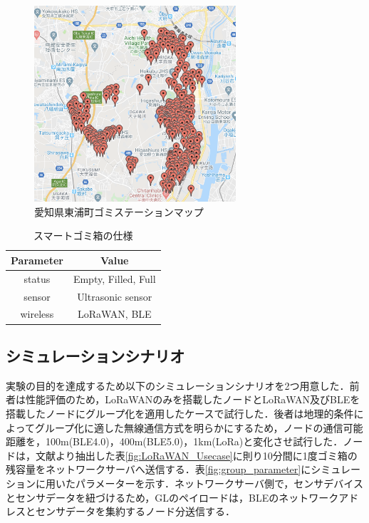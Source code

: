 \documentclass[Japanese]{dicomopapers}
\begin{document}
\begin{figure}[h]
    \centering
    \includegraphics[width=7.5cm]{img/garbage_station.png}
    \caption{愛知県東浦町ゴミステーションマップ}
    \label{garbage_station_map}
\end{figure}

\begin{table}[h]
    \centering
    \caption{スマートゴミ箱の仕様}\label{tab:smart_garbage_spec}
    \begin{tabular}{|c|c|}
    \hline
    \textbf{Parameter} & \textbf{Value} \\ \hline
    status   & Empty, Filled, Full   \\ \hline
    sensor   & Ultrasonic sensor     \\ \hline
    wireless & LoRaWAN, BLE          \\ \hline
    \end{tabular}
\end{table}

\subsection{シミュレーションシナリオ}
実験の目的を達成するため以下のシミュレーションシナリオを2つ用意した．前者は性能評価のため，LoRaWANのみを搭載したノードとLoRaWAN及びBLEを搭載したノードにグループ化を適用したケースで試行した．後者は地理的条件によってグループ化に適した無線通信方式を明らかにするため，ノードの通信可能距離を，100m(BLE4.0)，400m(BLE5.0)，1km(LoRa)と変化させ試行した．ノードは，文献\cite{lorawan_usecase}より抽出した表\ref{fig:LoRaWAN_Usecase}に則り10分間に1度ゴミ箱の残容量をネットワークサーバへ送信する．表\ref{fig:group_parameter}にシミュレーションに用いたパラメーターを示す．ネットワークサーバ側で，センサデバイスとセンサデータを紐づけるため，GLのペイロードは，BLEのネットワークアドレスとセンサデータを集約するノード分送信する．
\end{document}
